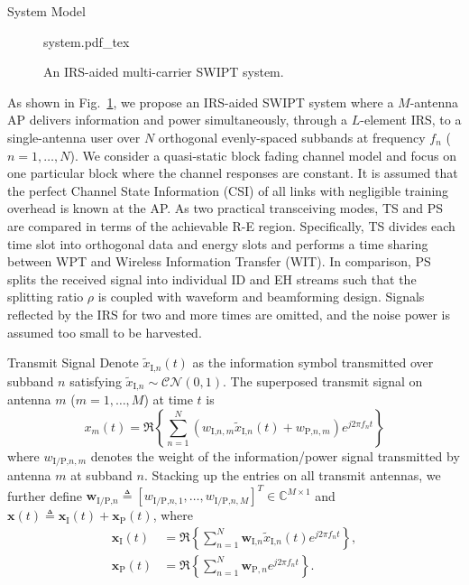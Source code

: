 \documentclass[journal]{IEEEtran}
\begin{document}
	\begin{section}{System Model}\label{se:system_model}
		\begin{figure}[!t]
			\centering
			\def\svgwidth{\columnwidth}
			{system.pdf_tex}
			\caption{An IRS-aided multi-carrier SWIPT system.}
			\label{fi:system}
		\end{figure}

		As shown in Fig.~\ref{fi:system}, we propose an IRS-aided SWIPT system where a $M$-antenna AP delivers information and power simultaneously, through a $L$-element IRS, to a single-antenna user over $N$ orthogonal evenly-spaced subbands at frequency $f_n$ ($n=1,\dots,N$). We consider a quasi-static block fading channel model and focus on one particular block where the channel responses are constant. It is assumed that the perfect Channel State Information (CSI) of all links with negligible training overhead is known at the AP. As two practical transceiving modes, TS and PS are compared in terms of the achievable R-E region. Specifically, TS divides each time slot into orthogonal data and energy slots and performs a time sharing between WPT and Wireless Information Transfer (WIT). In comparison, PS splits the received signal into individual ID and EH streams such that the splitting ratio $\rho$ is coupled with waveform and beamforming design. Signals reflected by the IRS for two and more times are omitted, and the noise power is assumed too small to be harvested.


		\begin{subsection}{Transmit Signal}
			Denote $\tilde{x}_{\text{I,}n}(t)$ as the information symbol transmitted over subband $n$ satisfying $\tilde{x}_{\text{I,}n}\sim\mathcal{CN}(0,1)$. The superposed transmit signal on antenna $m$ ($m=1,\dots,M$) at time $t$ is
			\begin{equation}\label{eq:x_m}
				x_m(t)=\Re\left\{\sum_{n=1}^N\left({w_{\text{I,}n,m}\tilde{x}_{\text{I,}n}(t)}+w_{\text{P,}n,m}\right){e^{j2{\pi}{f_n}{t}}}\right\}
			\end{equation}
			where $w_{\text{I/P,}n,m}$ denotes the weight of the information/power signal transmitted by antenna $m$ at subband $n$. Stacking up the entries on all transmit antennas, we further define $\boldsymbol{w}_{\text{I/P,}n} \triangleq [w_{\text{I/P,}n,1},\dots,w_{\text{I/P,}n,M}]^T \in \mathbb{C}^{M \times 1}$ and $\boldsymbol{x}(t) \triangleq \boldsymbol{x}_{\text{I}}(t)+\boldsymbol{x}_{\text{P}}(t)$, where
			\begin{align}
				\boldsymbol{x}_{\text{I}}(t) &= \Re{\left\{\sum_{n=1}^N\boldsymbol{w}_{\text{I,}n}\tilde{x}_{\text{I,}n}(t){e^{j2{\pi}{f_n}{t}}}\right\}},\label{eq:x_I}\\
				\boldsymbol{x}_{\text{P}}(t) &= \Re{\left\{\sum_{n=1}^N\boldsymbol{w}_{\text{P},n}{e^{j2{\pi}{f_n}{t}}}\right\}}.\label{eq:x_P}
			\end{align}
		\end{subsection}



\end{section}
\end{document}
